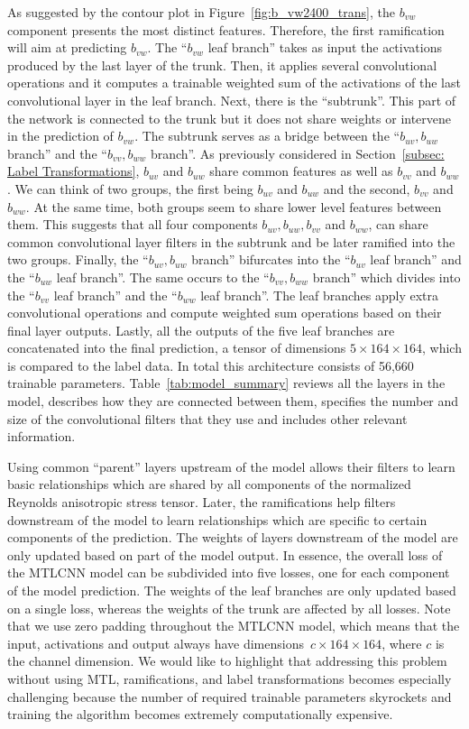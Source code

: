 \documentclass[11pt]{article}
\numberwithin{equation}{section}
\theoremstyle{plain}
\theoremstyle{definition}
\begin{document}
As suggested by the contour plot in Figure~\ref{fig:b_vw2400_trans}, the $b_{vw}$ component presents the most distinct features. Therefore, the first ramification will aim at predicting $b_{vw}$. The ``$b_{vw}$ leaf branch'' takes as input the activations produced by the last layer of the trunk. Then, it applies several convolutional operations and it computes a trainable weighted sum of the activations of the last convolutional layer in the leaf branch. Next, there is the ``subtrunk''. This part of the network is connected to the trunk but it does not share weights or intervene in the prediction of $b_{vw}$. The subtrunk serves as a bridge between the ``$b_{uv},b_{uw}$ branch'' and the ``$b_{vv},b_{ww}$ branch''. As previously considered in Section~\ref{subsec: Label Transformations}, $b_{uv}$ and $b_{uw}$ share common features as well as $b_{vv}$ and $b_{ww}$. We can think of two groups, the first being $b_{uv}$ and $b_{uw}$ and the second, $b_{vv}$ and $b_{ww}$. At the same time, both groups seem to share lower level features between them. This suggests that all four components $b_{uv}, b_{uw}, b_{vv}$ and $b_{ww}$, can share common convolutional layer filters in the subtrunk and be later ramified into the two groups. Finally, the ``$b_{uv},b_{uw}$ branch'' bifurcates into the ``$b_{uv}$ leaf branch'' and the ``$b_{uw}$ leaf branch''. The same occurs to the ``$b_{vv},b_{ww}$ branch'' which divides into the ``$b_{vv}$ leaf branch'' and the ``$b_{ww}$ leaf branch''. The leaf branches apply extra convolutional operations and compute weighted sum operations based on their final layer outputs. Lastly, all the outputs of the five leaf branches are concatenated into the final prediction, a tensor of dimensions $5\times164\times164$, which is compared to the label data. In total this architecture consists of 56,660 trainable parameters. Table~\ref{tab:model_summary} reviews all the layers in the model, describes how they are connected between them, specifies the number and size of the convolutional filters that they use and includes other relevant information.

Using common ``parent'' layers upstream of the model allows their filters to learn basic relationships which are shared by all components of the normalized Reynolds anisotropic stress tensor. Later, the ramifications help filters downstream of the model to learn relationships which are specific to certain components of the prediction. The weights of layers downstream of the model are only updated based on part of the model output. In essence, the overall loss of the MTLCNN model can be subdivided into five losses, one for each component of the model prediction. The weights of the leaf branches are only updated based on a single loss, whereas the weights of the trunk are affected by all losses. Note that we use zero padding throughout the MTLCNN model, which means that the input, activations and output always have dimensions $\,c\times164\times164$, where $c$ is the channel dimension. We would like to highlight that addressing this problem without using MTL, ramifications, and label transformations becomes especially challenging because the number of required trainable parameters skyrockets and training the algorithm becomes extremely computationally expensive.
\end{document}
